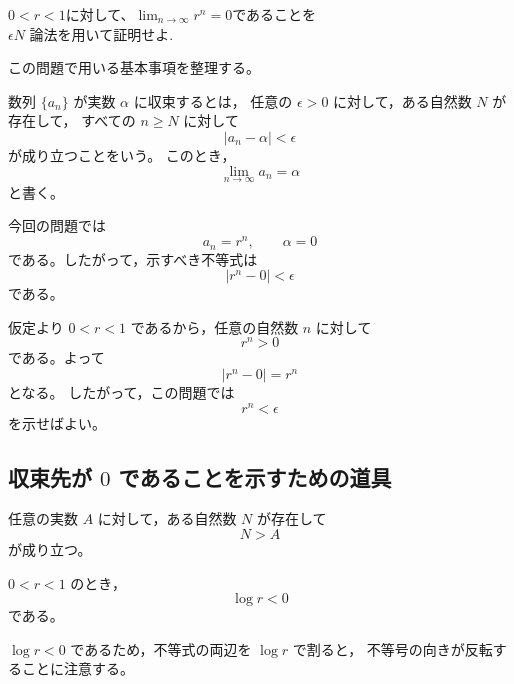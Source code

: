 
\begin{exercise}
	$0<r<1$に対して、$\lim_{n\rightarrow\infty}r^n=0$であることを\\$\epsilon N$ 論法を用いて証明せよ.
	
\end{exercise}

\begin{background}
	この問題で用いる基本事項を整理する。
	
	\begin{definition}[数列の極限]
		数列 $\{a_n\}$ が実数 $\alpha$ に収束するとは，
		任意の $\epsilon>0$ に対して，ある自然数 $N$ が存在して，
		すべての $n\geq N$ に対して
		\[
		|a_n-\alpha|<\epsilon
		\]
		が成り立つことをいう。
		このとき，
		\[
		\lim_{n\to\infty}a_n=\alpha
		\]
		と書く。
	\end{definition}
	
	\begin{remark}
		今回の問題では
		\[
		a_n=r^n,\qquad \alpha=0
		\]
		である。したがって，示すべき不等式は
		\[
		|r^n-0|<\epsilon
		\]
		である。
	\end{remark}
	
	\begin{remark}
		仮定より $0<r<1$ であるから，任意の自然数 $n$ に対して
		\[
		r^n>0
		\]
		である。よって
		\[
		|r^n-0|=r^n
		\]
		となる。
		したがって，この問題では
		\[
		r^n<\epsilon
		\]
		を示せばよい。
	\end{remark}
	
	\subsection{収束先が $0$ であることを示すための道具}
	
	\begin{theorem}[アルキメデスの性質]
		任意の実数 $A$ に対して，ある自然数 $N$ が存在して
		\[
		N>A
		\]
		が成り立つ。
	\end{theorem}
	
	\begin{lemma}
		$0<r<1$ のとき，
		\[
		\log r<0
		\]
		である。
	\end{lemma}
	
	\begin{remark}
		$\log r<0$ であるため，不等式の両辺を $\log r$ で割ると，
		不等号の向きが反転することに注意する。
	\end{remark}
\end{background}


